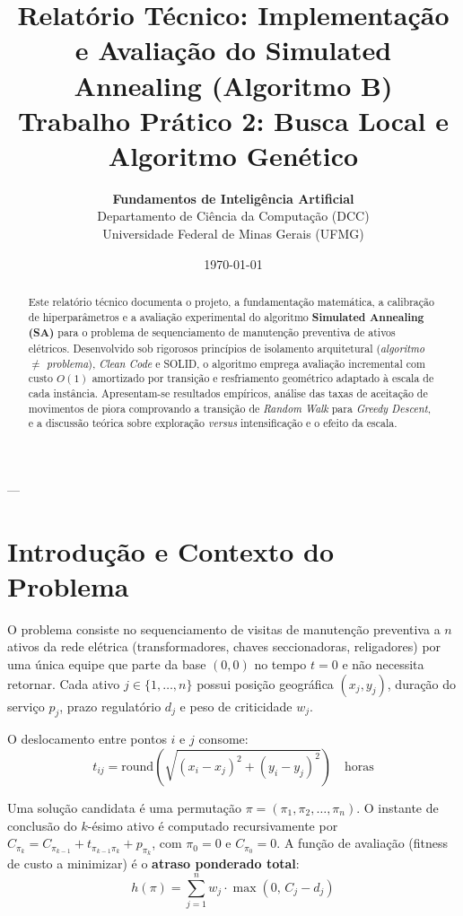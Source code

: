 \documentclass[11pt,a4paper]{article}
\title{\textbf{Relatório Técnico: Implementação e Avaliação do Simulated Annealing (Algoritmo B)}\\\large Trabalho Prático 2: Busca Local e Algoritmo Genético}
\author{\textbf{Fundamentos de Inteligência Artificial} \\ Departamento de Ciência da Computação (DCC) \\ Universidade Federal de Minas Gerais (UFMG)}
\date{\today}
\begin{document}
\maketitle

\begin{abstract}
Este relatório técnico documenta o projeto, a fundamentação matemática, a calibração de hiperparâmetros e a avaliação experimental do algoritmo \textbf{Simulated Annealing (SA)} para o problema de sequenciamento de manutenção preventiva de ativos elétricos. Desenvolvido sob rigorosos princípios de isolamento arquitetural (\textit{algoritmo $\neq$ problema}), \textit{Clean Code} e SOLID, o algoritmo emprega avaliação incremental com custo $O(1)$ amortizado por transição e resfriamento geométrico adaptado à escala de cada instância. Apresentam-se resultados empíricos, análise das taxas de aceitação de movimentos de piora comprovando a transição de \textit{Random Walk} para \textit{Greedy Descent}, e a discussão teórica sobre exploração \textit{versus} intensificação e o efeito da escala.
\end{abstract}

---

\section{Introdução e Contexto do Problema}

O problema consiste no sequenciamento de visitas de manutenção preventiva a $n$ ativos da rede elétrica (transformadores, chaves seccionadoras, religadores) por uma única equipe que parte da base $(0, 0)$ no tempo $t=0$ e não necessita retornar. Cada ativo $j \in \{1, \dots, n\}$ possui posição geográfica $(x_j, y_j)$, duração do serviço $p_j$, prazo regulatório $d_j$ e peso de criticidade $w_j$.

O deslocamento entre pontos $i$ e $j$ consome:
\begin{equation}
t_{ij} = \mathrm{round}\left(\sqrt{(x_i - x_j)^2 + (y_i - y_j)^2}\right) \quad \text{horas}
\end{equation}

Uma solução candidata é uma permutação $\pi = (\pi_1, \pi_2, \dots, \pi_n)$. O instante de conclusão do $k$-ésimo ativo é computado recursivamente por $C_{\pi_k} = C_{\pi_{k-1}} + t_{\pi_{k-1}\pi_k} + p_{\pi_k}$, com $\pi_0 = 0$ e $C_{\pi_0} = 0$. A função de avaliação (fitness de custo a minimizar) é o \textbf{atraso ponderado total}:
\begin{equation}
h(\pi) = \sum_{j=1}^n w_j \cdot \max(0, \, C_j - d_j)
\end{equation}
\end{document}
